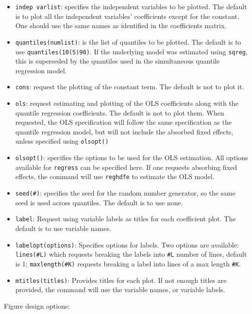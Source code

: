 \documentclass[bib]{statapress}
\providecommand{\tightlist}{%
  \setlength{\itemsep}{0pt}\setlength{\parskip}{0pt}}\usepackage{longtable,booktabs,array}
\begin{document}
\begin{itemize}
\tightlist
\item
  \texttt{indep\ varlist}: specifies the independent variables to be
  plotted. The default is to plot all the independent variables'
  coefficients except for the constant. One should use the same names as
  identified in the coefficients matrix.
\item
  \texttt{quantiles(numlist)}: is the list of quantiles to be plotted.
  The default is to use \texttt{quantiles(10(5)90)}. If the underlying
  model was estimated using \texttt{sqreg}, this is superseded by the
  quantiles used in the simultaneous quantile regression model.
\item
  \texttt{cons}: request the plotting of the constant term. The default
  is not to plot it.
\item
  \texttt{ols}: request estimating and plotting of the OLS coefficients
  along with the quantile regression coefficients. The default is not to
  plot them. When requested, the OLS specification will follow the same
  specification as the quantile regression model, but will not include
  the absorbed fixed effects, unless specified using \texttt{olsopt()}
\item
  \texttt{olsopt()}: specifies the options to be used for the OLS
  estimation. All options available for \texttt{regress} can be
  specified here. If one requests absorbing fixed effects, the command
  will use \texttt{reghdfe} to estimate the OLS model.
\item
  \texttt{seed(\#)}: specifies the seed for the random number generator,
  so the same seed is used across quantiles. The default is to use none.
\item
  \texttt{label}: Request using variable labels as titles for each
  coefficient plot. The default is to use variable names.\\
\item
  \texttt{labelopt(options)}: Specifies options for labels. Two options
  are available: \texttt{lines(\#L)} which requests breaking the labels
  into \texttt{\#L} number of lines, default is 1;
  \texttt{maxlength(\#K)} requests breaking a label into lines of a max
  length \texttt{\#K}.
\item
  \texttt{mtitles(titles)}: Provides titles for each plot. If not enough
  titles are provided, the command will use the variable names, or
  variable labels.
\end{itemize}

Figure design options:
\end{document}
